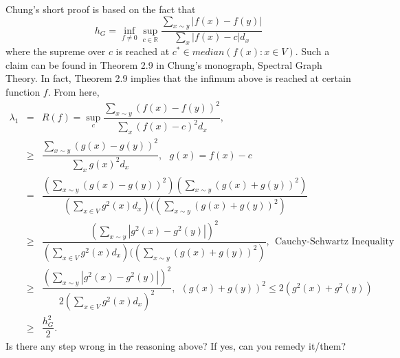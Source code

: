\documentclass[11pt]{article}
\def\R{{\mathbb R}}
\begin{document}
\begin{enumerate}
Chung's short proof is based on the fact that 
\begin{equation} 
h_G = \inf_{f\neq 0} \sup_{c\in \R} \frac{\sum_{x\sim y} |f(x) - f(y)|}{\sum_x |f(x) -c|d_x} 
\end{equation}
where the supreme over $c$ is reached at $c^*\in median(f(x):x\in V)$. Such a claim can be found in Theorem 2.9 in Chung's monograph, Spectral Graph Theory. In fact, Theorem 2.9 implies that the infimum above is reached at certain function $f$. From here, 
\begin{eqnarray}
\lambda_1 & =& R(f)=\sup_c \dfrac{\sum_{x\sim y}(f(x) - f(y))^2}{\sum_{x}(f(x)-c)^2 d_x},  \\
& \geq  &\dfrac{\sum_{x\sim y}(g(x) - g(y))^2}{\sum_{x}g(x)^2 d_x}, \ \ \ g(x)=f(x)-c\\
& = & \dfrac{(\sum_{x\sim y}(g(x) - g(y))^2)(\sum_{x\sim y}(g(x) +g(y))^2)}{(\sum_{x\in V}g^2(x)d_x)((\sum_{x\sim y}(g(x) +g(y))^2)} \\
& \ge & \dfrac{(\sum_{x\sim y}|g^2(x) - g^2(y)|)^2}{(\sum_{x\in V}g^2(x)d_x)((\sum_{x\sim y}(g(x) +g(y))^2)} , \ \ \textrm{Cauchy-Schwartz Inequality} \\
& \ge & \dfrac{(\sum_{x\sim y}|g^2(x) - g^2(y)|)^2}{2( \sum_{x\in V}g^2(x)d_x)^2} , \ \ \textrm{$(g(x)+g(y))^2\leq 2 (g^2(x)+g^2(y))$} \\
& \ge & \dfrac{h_G^2}{2}.
\end{eqnarray}
Is there any step wrong in the reasoning above? If yes, can you remedy it/them?

\end{enumerate}
\end{document}
